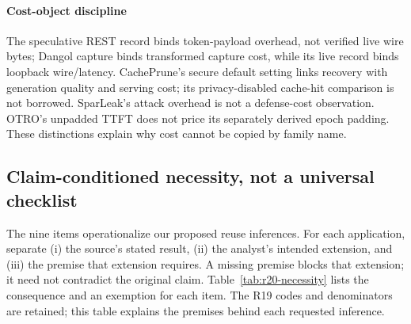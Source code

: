 \paragraph{Cost-object discipline}
The speculative REST record binds token-payload overhead, not verified live wire bytes; Dangol capture binds transformed capture cost, while its live record binds loopback wire/latency. CachePrune's secure default setting links recovery with generation quality and serving cost; its privacy-disabled cache-hit comparison is not borrowed. SparLeak's attack overhead is not a defense-cost observation. OTRO's unpadded TTFT does not price its separately derived epoch padding. These distinctions explain why cost cannot be copied by family name.

\subsection{Claim-conditioned necessity, not a universal checklist}
The nine items operationalize our proposed reuse inferences. For each application, separate (i) the source's stated result, (ii) the analyst's intended extension, and (iii) the premise that extension requires. A missing premise blocks that extension; it need not contradict the original claim. Table~\ref{tab:r20-necessity} lists the consequence and an exemption for each item. The R19 codes and denominators are retained; this table explains the premises behind each requested inference.


\begingroup\footnotesize\setlength{\tabcolsep}{3pt}

\endgroup
